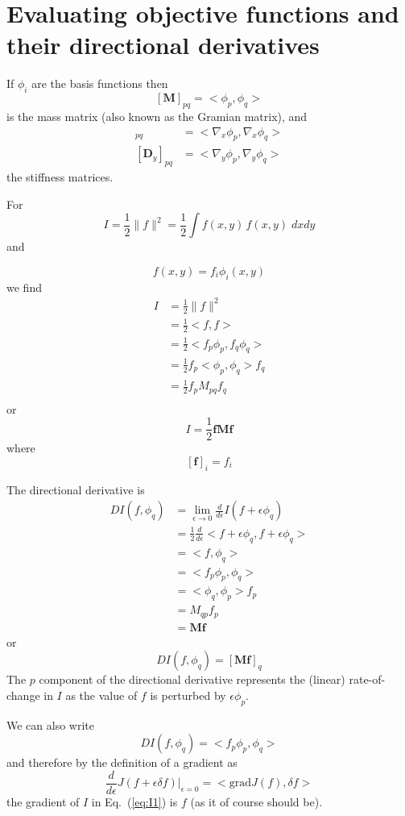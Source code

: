 \documentclass[10pt,a4paper]{book}
\begin{document}
\section{Evaluating objective functions and their directional derivatives}
\label{sec:gradev}
If $\phi_i$ are the basis functions then
\[
[\bm{M}]_{pq}=<\phi_p , \phi_q>
\]
is the mass matrix (also known as the Gramian matrix), and
\begin{align*}
[\bm{D}_x]_{pq} & =< \nabla_x \phi_p , \nabla_x \phi_q>\\
[\bm{D}_y]_{pq} & =< \nabla_y \phi_p , \nabla_y \phi_q>
\end{align*}
the stiffness matrices.

For 
\begin{equation}
I = \frac{1}{2} \| f \|^2 = \frac{1}{2} \int f(x,y) \, f(x,y)\; dx dy
\label{eq:I1}
\end{equation}
 and

\[
f(x,y)=f_i \phi_i(x,y)
\]
we find
\begin{align*}
I &= \frac{1}{2} \| f \|^2 \\
  &=  \frac{1}{2} < f , f> \\
  &= \frac{1}{2} < f_p \phi_p , f_q \phi_q>\\
  &= \frac{1}{2} f_p <  \phi_p , \phi_q> f_q\\
  &= \frac{1}{2} f_p M_{pq} f_q\\
\end{align*}
or
\[
I = \frac{1}{2} \bm{f} \bm{M} \bm{f}
\]
where
\[
[\bm{f}]_i =f_i 
\]

The directional derivative is
\begin{align*}
D I(f,\phi_q) &= \lim_{\epsilon \to 0} \frac{d}{d \epsilon} I(f+ \epsilon \phi_q) \\
              &= \frac{1}{2} \frac{d}{d \epsilon} < f+\epsilon \phi_q , f+\epsilon \phi_q> \\
              &= <f , \phi_q > \\
              &= <f_p \phi_p , \phi_q > \\
              &= < \phi_q , \phi_p > f_p \\
              &= M_{qp} f_p\\
              &= \bm{M} \bm{f}
\end{align*}
or
\[
D I(f,\phi_q) = [\bm{M} \bm{f}]_q
\]
The $p$ component of the directional derivative represents the (linear)
rate-of-change in $I$ as the value of $f$ is perturbed by
$\epsilon \phi_p$.

We can also write
\[ 
D I(f,\phi_q) = < f_p \phi_p , \phi_q> 
\]
and therefore by the definition of a gradient as
\[
\frac{d}{d \epsilon} J(f+\epsilon \delta f)|_{\epsilon=0} = < \mathrm{grad} J(f), \delta f>
\]
the gradient of $I$ in  Eq.~(\ref{eq:I1}) is $f$ (as it of course should be).
\end{document}
